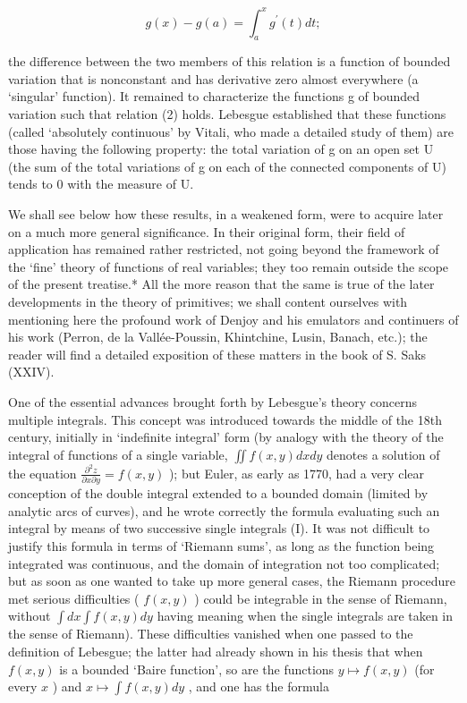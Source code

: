 \[
g (x) - g (a) = \int_ {a} ^ {x} g ^ {\prime} (t) d t;\tag{2}
\]

the difference between the two members of this relation is a function of bounded variation that is nonconstant and has derivative zero almost everywhere (a `singular' function). It remained to characterize the functions g of bounded variation such that relation (2) holds. Lebesgue established that these functions (called `absolutely continuous' by Vitali, who made a detailed study of them) are those having the following property: the total variation of g on an open set U (the sum of the total variations of g on each of the connected components of U) tends to 0 with the measure of U.

We shall see below how these results, in a weakened form, were to acquire later on a much more general significance. In their original form, their field of application has remained rather restricted, not going beyond the framework of the `fine' theory of functions of real variables; they too remain outside the scope of the present treatise.* All the more reason that the same is true of the later developments in the theory of primitives; we shall content ourselves with mentioning here the profound work of Denjoy and his emulators and continuers of his work (Perron, de la Vallée-Poussin, Khintchine, Lusin, Banach, etc.); the reader will find a detailed exposition of these matters in the book of S. Saks (XXIV).

One of the essential advances brought forth by Lebesgue's theory concerns multiple integrals. This concept was introduced towards the middle of the 18th century, initially in `indefinite integral' form (by analogy with the theory of the integral of functions of a single variable, \(\iint f(x,y) dx dy\) denotes a solution of the equation \(\frac{\partial^2 z}{\partial x \partial y} = f(x,y)\) ); but Euler, as early as 1770, had a very clear conception of the double integral extended to a bounded domain (limited by analytic arcs of curves), and he wrote correctly the formula evaluating such an integral by means of two successive single integrals (I). It was not difficult to justify this formula in terms of `Riemann sums', as long as the function being integrated was continuous, and the domain of integration not too complicated; but as soon as one wanted to take up more general cases, the Riemann procedure met serious difficulties ( \(f(x,y)\) ) could be integrable in the sense of Riemann, without \(\int dx \int f(x,y) dy\) having meaning when the single integrals are taken in the sense of Riemann). These difficulties vanished when one passed to the definition of Lebesgue; the latter had already shown in his thesis that when \(f(x,y)\) is a bounded `Baire function', so are the functions \(y \mapsto f(x,y)\) (for every \(x\) ) and \(x \mapsto \int f(x,y) dy\) , and one has the formula

